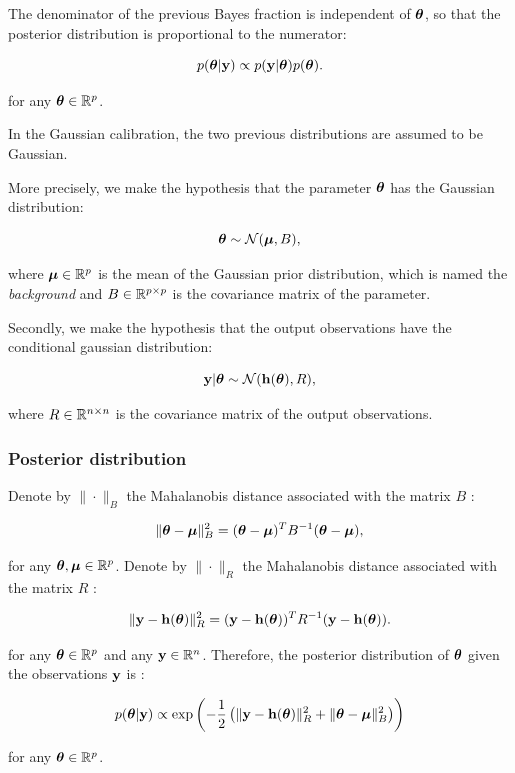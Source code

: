 \documentclass{beamer}
\begin{document}
\begin{frame}

The denominator of the previous Bayes fraction is independent of
$\boldsymbol{\theta}$, so that the posterior distribution is
proportional to the numerator:

$$
p(\boldsymbol{\theta} | {\bf y}) \propto  p({\bf y} | \boldsymbol{\theta}) p(\boldsymbol{\theta}).
$$

for any $\boldsymbol{\theta}\in\mathbb{R}^p$.

In the Gaussian calibration, the two previous distributions are assumed
to be Gaussian.

More precisely, we make the hypothesis that the parameter
$\boldsymbol{\theta}$ has the Gaussian distribution:

$$
\boldsymbol{\theta} \sim \mathcal{N}(\boldsymbol{\mu}, B),
$$

where $\boldsymbol{\mu}\in\mathbb{R}^p$ is the mean of the Gaussian prior
distribution, which is named the \emph{background} and
$B\in\mathbb{R}^{p \times p}$ is the covariance matrix of the
parameter.

\end{frame}

\begin{frame}
Secondly, we make the hypothesis that the output observations have the
conditional gaussian distribution:

$$
{\bf y} | \boldsymbol{\theta} \sim \mathcal{N}({\bf h}(\boldsymbol{\theta}), R),
$$

where $R\in\mathbb{R}^{n \times n}$ is the covariance matrix of the
output observations.
\end{frame}


\begin{frame}
\frametitle{Posterior distribution}

Denote by $\|\cdot\|_B$ the Mahalanobis distance associated with
the matrix $B$ :

$$
\|\boldsymbol{\theta}-\boldsymbol{\mu} \|^2_B = (\boldsymbol{\theta}-\boldsymbol{\mu} )^T B^{-1} (\boldsymbol{\theta}-\boldsymbol{\mu} ),
$$

for any $\boldsymbol{\theta},\boldsymbol{\mu} \in \mathbb{R}^p$. Denote by
$\|\cdot\|_R$ the Mahalanobis distance associated with the matrix
$R$ :

$$
\|{\bf y}-{\bf h}(\boldsymbol{\theta})\|^2_R = ({\bf y}-{\bf h}(\boldsymbol{\theta}))^T R^{-1} ({\bf y}-{\bf h}(\boldsymbol{\theta})).
$$

for any $\boldsymbol{\theta} \in \mathbb{R}^p$ and any
${\bf y} \in \mathbb{R}^{n}$. Therefore, the posterior distribution
of $\boldsymbol{\theta}$ given the observations ${\bf y}$ is :

$$
   p(\boldsymbol{\theta}|{\bf y}) \propto \exp\left( -\frac{1}{2} \left( \|{\bf y}-{\bf h}(\boldsymbol{\theta})\|^2_R 
   + \|\boldsymbol{\theta}-\boldsymbol{\mu} \|^2_B \right) \right)
$$

for any $\boldsymbol{\theta}\in\mathbb{R}^p$.
\end{frame}
\end{document}
